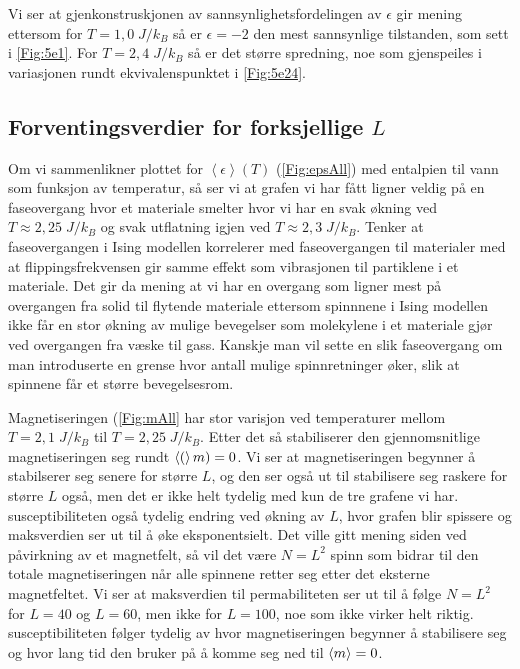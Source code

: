 \documentclass[reprint,english,notitlepage]{revtex4-2}  %
\begin{document}
Vi ser at gjenkonstruskjonen av sannsynlighetsfordelingen av $\epsilon$ gir mening ettersom for $T = 1,0 \; J/k_B$ så er $\epsilon = -2$ den mest sannsynlige tilstanden, som sett i \autoref{Fig:5e1}. For $T = 2,4 \; J/k_B$ så er det større spredning, noe som gjenspeiles i variasjonen rundt ekvivalenspunktet i \autoref{Fig:5e24}.

\subsection*{Forventingsverdier for forksjellige $L$}

Om vi sammenlikner plottet for $\left < \epsilon \right > (T)$ (\autoref{Fig:epsAll}) med entalpien til vann som funksjon av temperatur, så ser vi at grafen vi har fått ligner veldig på en faseovergang hvor et materiale smelter hvor vi har en svak økning ved $T \approx 2,25 \; J/k_B$ og svak utflatning igjen ved $T \approx 2,3 \; J/k_B$. Tenker at faseovergangen i Ising modellen korrelerer med faseovergangen til materialer med at flippingsfrekvensen gir samme effekt som vibrasjonen til partiklene i et materiale. Det gir da mening at vi har en overgang som ligner mest på overgangen fra solid til flytende materiale ettersom spinnnene i Ising modellen ikke får en stor økning av mulige bevegelser som molekylene i et materiale gjør ved overgangen fra væske til gass. Kanskje man vil sette en slik faseovergang om man introduserte en grense hvor antall mulige spinnretninger øker, slik at spinnene får et større bevegelsesrom.

Magnetiseringen (\autoref{Fig:mAll} har stor varisjon ved temperaturer mellom $T = 2,1 \; J/k_B$ til $T = 2,25 \; J/k_B$. Etter det så stabiliserer den gjennomsnitlige magnetiseringen seg rundt $ \expval(m) = 0$. Vi ser at magnetiseringen begynner å stabilserer seg senere for større $L$, og den ser også ut til stabilisere seg raskere for større $L$ også, men det er ikke helt tydelig med kun de tre grafene vi har. susceptibiliteten også tydelig endring ved økning av $L$, hvor grafen blir spissere og maksverdien ser ut til å øke eksponentsielt. Det ville gitt mening siden ved påvirkning av et magnetfelt, så vil det være $N = L^2$ spinn som bidrar til den totale magnetiseringen når alle spinnene retter seg etter det eksterne magnetfeltet. Vi ser at maksverdien til permabiliteten ser ut til å følge $N = L^2$ for $L = 40$ og $L = 60$, men ikke for $L = 100$, noe som ikke virker helt riktig. susceptibiliteten følger tydelig av hvor magnetiseringen begynner å stabilisere seg og hvor lang tid den bruker på å komme seg ned til $\expval{m} = 0$.
\end{document}
